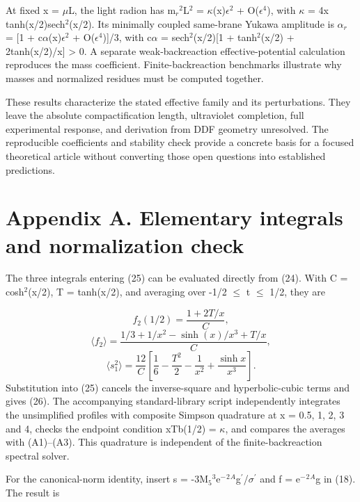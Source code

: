 \documentclass[11pt]{article}
\begin{document}
At fixed x = \(\mu\)L, the light radion has m\({}_r\)\({}^2\)L\({}^2\) = \(\kappa\)(x)\(\epsilon\)\({}^2\) + O(\(\epsilon\)\({}^4\)), with \(\kappa\) = 4x tanh(x/2)sech\({}^2\)(x/2). Its minimally coupled same-brane Yukawa amplitude is \(\alpha\)\({}_r\) = [1 + c\(\alpha\)(x)\(\epsilon\)\({}^2\) + O(\(\epsilon\)\({}^4\))]/3, with c\(\alpha\) = sech\({}^2\)(x/2)[1 + tanh\({}^2\)(x/2) + 2tanh(x/2)/x] > 0. A separate weak-backreaction effective-potential calculation reproduces the mass coefficient. Finite-backreaction benchmarks illustrate why masses and normalized residues must be computed together.

These results characterize the stated effective family and its perturbations. They leave the absolute compactification length, ultraviolet completion, full experimental response, and derivation from DDF geometry unresolved. The reproducible coefficients and stability check provide a concrete basis for a focused theoretical article without converting those open questions into established predictions.

\section*{Appendix A. Elementary integrals and normalization check}
The three integrals entering (25) can be evaluated directly from (24). With C = cosh\({}^2\)(x/2), T = tanh(x/2), and averaging over -1/2 \(\leq\) t \(\leq\) 1/2, they are

\begin{equation}
f_2(1/2)=\frac{1+2T/x}{C},\tag{A1}
\end{equation}
\begin{equation}
\langle f_2\rangle=\frac{1/3+1/x^2-\sinh(x)/x^3+T/x}{C},\tag{A2}
\end{equation}
\begin{equation}
\langle s_1^2\rangle=\frac{12}{C}\left[\frac16-\frac{T^2}{2}-\frac1{x^2}+\frac{\sinh x}{x^3}\right].\tag{A3}
\end{equation}
Substitution into (25) cancels the inverse-square and hyperbolic-cubic terms and gives (26). The accompanying standard-library script independently integrates the unsimplified profiles with composite Simpson quadrature at x = 0.5, 1, 2, 3 and 4, checks the endpoint condition xTb(1/2) = \(\kappa\), and compares the averages with (A1)--(A3). This quadrature is independent of the finite-backreaction spectral solver.

For the canonical-norm identity, insert s = -3M\({}_5\)\({}^3\)e\({}^-\)\({}^2\)\({}^A\)g\({}^\prime\)/\(\sigma\)\({}^\prime\) and f = e\({}^-\)\({}^2\)\({}^A\)g in (18). The result is
\end{document}
